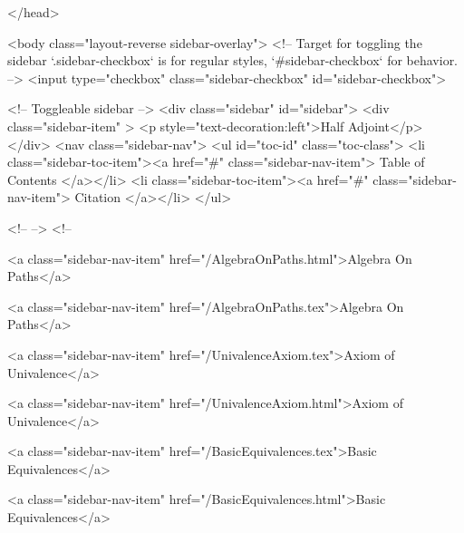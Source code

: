   
</head>




  <body class="layout-reverse sidebar-overlay">
    <!-- Target for toggling the sidebar `.sidebar-checkbox` is for regular
     styles, `#sidebar-checkbox` for behavior. -->
<input type="checkbox" class="sidebar-checkbox" id="sidebar-checkbox">

<!-- Toggleable sidebar -->
<div class="sidebar" id="sidebar">
  <div class="sidebar-item" >
    <p style="text-decoration:left">Half Adjoint</p>
  </div>
  <nav class="sidebar-nav">
    <ul id="toc-id" class="toc-class">
  <li class="sidebar-toc-item"><a href="#" class="sidebar-nav-item"> Table of Contents </a></li>
  <li class="sidebar-toc-item"><a href="#" class="sidebar-nav-item"> Citation </a></li>
</ul>


    <!--  -->
    <!-- 
      
    
      
    
      
    
      
    
      
        
      
    
      
        
          <a class="sidebar-nav-item" href="/AlgebraOnPaths.html">Algebra On Paths</a>
        
      
    
      
        
          <a class="sidebar-nav-item" href="/AlgebraOnPaths.tex">Algebra On Paths</a>
        
      
    
      
        
          <a class="sidebar-nav-item" href="/UnivalenceAxiom.tex">Axiom of Univalence</a>
        
      
    
      
        
          <a class="sidebar-nav-item" href="/UnivalenceAxiom.html">Axiom of Univalence</a>
        
      
    
      
        
          <a class="sidebar-nav-item" href="/BasicEquivalences.tex">Basic Equivalences</a>
        
      
    
      
        
          <a class="sidebar-nav-item" href="/BasicEquivalences.html">Basic Equivalences</a>
        
